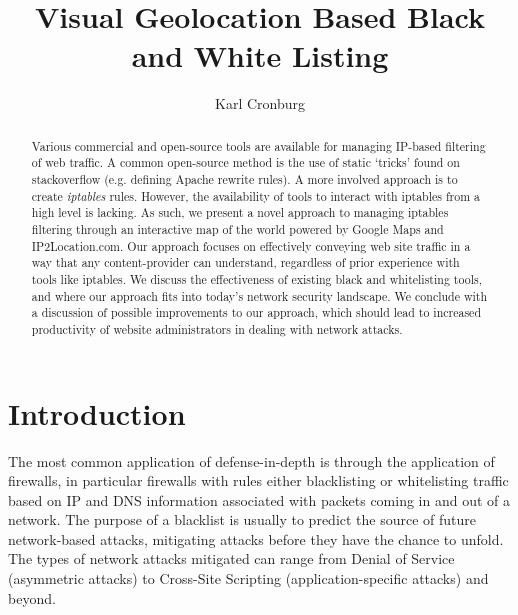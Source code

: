 \documentclass[aps,preprint,amsmath,amssymb]{revtex4}
\begin{document}
\title{Visual Geolocation Based Black and White Listing}

\author{Karl Cronburg}

\begin{abstract}
Various commercial and open-source tools are available for managing IP-based
filtering of web traffic. A common open-source method is the 
use of static `tricks' found on stackoverflow (e.g. defining Apache rewrite
rules). A more involved approach is to create \emph{iptables} rules.
However, the availability of tools to interact with iptables from a
high level is lacking.
As such, we present a novel approach to managing iptables filtering
through an interactive map of the world powered by Google Maps
and IP2Location.com. Our approach focuses on effectively conveying
web site traffic in a way that any content-provider can understand, regardless of
prior experience with tools like iptables.
We discuss the effectiveness of existing black and whitelisting tools,
and where our approach fits into today's network security landscape.
We conclude with a discussion of possible improvements
to our approach, which should lead to increased productivity of website
administrators in dealing with network attacks. 
\end{abstract}

\maketitle

\section{Introduction}
The most common application of defense-in-depth is through the application of firewalls,
in particular firewalls with rules either blacklisting or whitelisting traffic based
on IP and DNS information associated with packets coming in and out of a network. The
purpose of a blacklist is usually to predict the source of future network-based attacks,
mitigating attacks before they have the chance to unfold.~\cite{DBLP:journals}
The types of network attacks mitigated can range from Denial of Service (asymmetric attacks)
to Cross-Site Scripting (application-specific attacks) and beyond.
\end{document}

